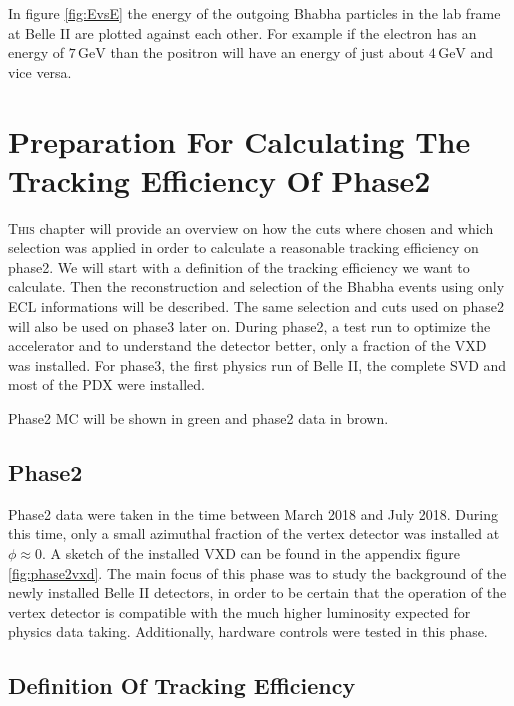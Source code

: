 \documentclass[a4paper,11pt,twosided,final,german,openbib,pdftex,listof=totoc,bibliography=totoc]{scrbook}
\begin{document}
In figure \ref{fig:EvsE} the energy of the outgoing Bhabha particles in the lab frame at Belle II are plotted against each other. For example if the electron has an energy of $7\,\textrm{GeV}$ than the positron will have an energy of just about $4\,\textrm{GeV}$ and vice versa.












\chapter{Preparation  For Calculating The Tracking Efficiency Of Phase2}
\label{chap:Phase2Eff}

\lettrine{T}{his} chapter will provide an overview on how the cuts where chosen and which selection was applied in order to calculate a reasonable tracking efficiency on phase2.
We will start with a definition of the tracking efficiency we want to calculate. Then the reconstruction and selection of the Bhabha events using only ECL informations will be described. The same selection and cuts used on phase2 will also be used on phase3 later on.
During phase2, a test run to optimize the accelerator and to understand the detector better, only a fraction of the VXD was installed. For phase3, the first physics run of Belle II, the complete SVD and most of the PDX were installed.

Phase2 MC will be shown in green and phase2 data in brown.

\section{Phase2}
\label{sec:Phase2}

Phase2 data were taken in the time between March 2018 and July 2018. During this time, only a small azimuthal fraction of the vertex detector was installed at $\phi \approx 0$. A sketch of the installed VXD can be found in the appendix figure \ref{fig:phase2vxd}. The main focus of this phase was to study the background of the newly installed Belle II detectors, in order to be certain that the operation of the vertex detector is compatible with the much higher luminosity expected for physics data taking. Additionally, hardware controls were tested in this phase.


\section{Definition Of Tracking Efficiency}
\label{sec:Eff}
\end{document}
